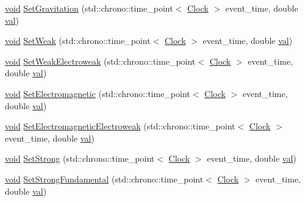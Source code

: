 \begin{DoxyCompactItemize}
\item 
\mbox{\hyperlink{glad_8h_a950fc91edb4504f62f1c577bf4727c29}{void}} \mbox{\hyperlink{class_elementary_force_aa36d5875964f7e2fc981f6fc5431be7f}{Set\+Gravitation}} (std\+::chrono\+::time\+\_\+point$<$ \mbox{\hyperlink{universe_8h_a0ef8d951d1ca5ab3cfaf7ab4c7a6fd80}{Clock}} $>$ event\+\_\+time, double \mbox{\hyperlink{glad_8h_a26942fd2ed566ef553eae82d2c109c8f}{val}})
\item 
\mbox{\hyperlink{glad_8h_a950fc91edb4504f62f1c577bf4727c29}{void}} \mbox{\hyperlink{class_elementary_force_a093cdf0810e95f1d973bd9dc88c6788b}{Set\+Weak}} (std\+::chrono\+::time\+\_\+point$<$ \mbox{\hyperlink{universe_8h_a0ef8d951d1ca5ab3cfaf7ab4c7a6fd80}{Clock}} $>$ event\+\_\+time, double \mbox{\hyperlink{glad_8h_a26942fd2ed566ef553eae82d2c109c8f}{val}})
\item 
\mbox{\hyperlink{glad_8h_a950fc91edb4504f62f1c577bf4727c29}{void}} \mbox{\hyperlink{class_elementary_force_a38d4f86f18a9f84a4198ee43bc90f6b4}{Set\+Weak\+Electroweak}} (std\+::chrono\+::time\+\_\+point$<$ \mbox{\hyperlink{universe_8h_a0ef8d951d1ca5ab3cfaf7ab4c7a6fd80}{Clock}} $>$ event\+\_\+time, double \mbox{\hyperlink{glad_8h_a26942fd2ed566ef553eae82d2c109c8f}{val}})
\item 
\mbox{\hyperlink{glad_8h_a950fc91edb4504f62f1c577bf4727c29}{void}} \mbox{\hyperlink{class_elementary_force_a67f6845bd715c29c17387d291b343a1b}{Set\+Electromagnetic}} (std\+::chrono\+::time\+\_\+point$<$ \mbox{\hyperlink{universe_8h_a0ef8d951d1ca5ab3cfaf7ab4c7a6fd80}{Clock}} $>$ event\+\_\+time, double \mbox{\hyperlink{glad_8h_a26942fd2ed566ef553eae82d2c109c8f}{val}})
\item 
\mbox{\hyperlink{glad_8h_a950fc91edb4504f62f1c577bf4727c29}{void}} \mbox{\hyperlink{class_elementary_force_af4f12038c33d7edf9f13339fcd632ec9}{Set\+Electromagnetic\+Electroweak}} (std\+::chrono\+::time\+\_\+point$<$ \mbox{\hyperlink{universe_8h_a0ef8d951d1ca5ab3cfaf7ab4c7a6fd80}{Clock}} $>$ event\+\_\+time, double \mbox{\hyperlink{glad_8h_a26942fd2ed566ef553eae82d2c109c8f}{val}})
\item 
\mbox{\hyperlink{glad_8h_a950fc91edb4504f62f1c577bf4727c29}{void}} \mbox{\hyperlink{class_elementary_force_aa1b5708cfab2069049fec5c924e1f246}{Set\+Strong}} (std\+::chrono\+::time\+\_\+point$<$ \mbox{\hyperlink{universe_8h_a0ef8d951d1ca5ab3cfaf7ab4c7a6fd80}{Clock}} $>$ event\+\_\+time, double \mbox{\hyperlink{glad_8h_a26942fd2ed566ef553eae82d2c109c8f}{val}})
\item 
\mbox{\hyperlink{glad_8h_a950fc91edb4504f62f1c577bf4727c29}{void}} \mbox{\hyperlink{class_elementary_force_afb00e9a10ec33eeb1daefce39b0468b7}{Set\+Strong\+Fundamental}} (std\+::chrono\+::time\+\_\+point$<$ \mbox{\hyperlink{universe_8h_a0ef8d951d1ca5ab3cfaf7ab4c7a6fd80}{Clock}} $>$ event\+\_\+time, double \mbox{\hyperlink{glad_8h_a26942fd2ed566ef553eae82d2c109c8f}{val}})

\end{DoxyCompactItemize}
